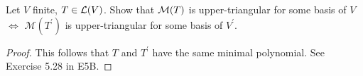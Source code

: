 \documentclass[../main.tex]{subfiles}
\begin{document}
\begin{exercise}
  Let $V$ finite, $T \in \mathcal{L}(V)$. Show that $\mathcal{M}(T)$ is upper-triangular for some basis of $V$
  $\iff$ $\mathcal{M}(T^\prime)$ is upper-triangular for some basis of $V^\prime$.
\end{exercise}
\begin{proof}
  This follows that $T$ and $T^\prime$ have the same minimal polynomial.
  See Exercise 5.28 in E5B.
\end{proof}
\end{document}
